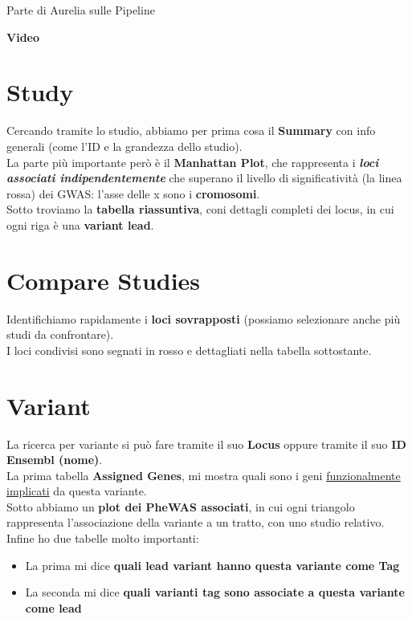 \documentclass{article}
\begin{document}
\newpage
\begin{center}
    {\color{red} \LARGE Parte di Aurelia sulle Pipeline}
\end{center}
\newpage

\begin{center}
    \vspace*{1cm}
    \LARGE
    \textbf{Video}

\end{center}
\Large
\section*{Study}
Cercando tramite lo studio, abbiamo per prima cosa il \textbf{Summary} con info generali (come l'ID e la grandezza dello studio).\\
La parte più importante però è il \textbf{Manhattan Plot}, che rappresenta i \textbf{\textit{loci associati indipendentemente}} che superano il livello di significatività (la linea rossa) dei GWAS: l'asse delle x sono i \textbf{cromosomi}.\\
Sotto troviamo la \textbf{tabella riassuntiva}, coni dettagli completi dei locus, in cui ogni riga è una \textbf{variant lead}.
\section*{Compare Studies}
Identifichiamo rapidamente i \textbf{loci sovrapposti} (possiamo selezionare anche più studi da confrontare).\\
I loci condivisi sono segnati in rosso e dettagliati nella tabella sottostante.
\section*{Variant}
La ricerca per variante si può fare tramite il suo \textbf{Locus} oppure tramite il suo \textbf{ID Ensembl (nome)}.\\
La prima tabella \textbf{Assigned Genes}, mi mostra quali sono i geni \underline{funzionalmente implicati} da questa variante.\\
Sotto abbiamo un \textbf{plot dei PheWAS associati}, in cui ogni triangolo rappresenta l'associazione della variante a un tratto, con uno studio relativo.\\
Infine ho due tabelle molto importanti:
\begin{itemize}
    \item La prima mi dice \textbf{quali lead variant hanno questa variante come Tag}
    \item La seconda mi dice \textbf{quali varianti tag sono associate a questa variante come lead}
\end{itemize}
\end{document}
